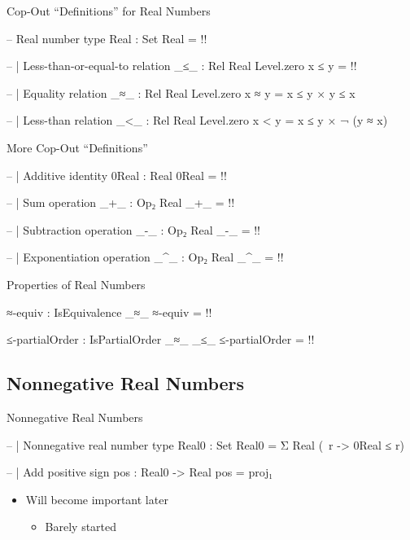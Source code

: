 \documentclass{beamer}
\begin{document}
\begin{frame}{Cop-Out ``Definitions'' for Real Numbers}
\begin{code}
-- Real number type
Real : Set
Real = {!!}

-- | Less-than-or-equal-to relation
_≤_ : Rel Real Level.zero
x ≤ y = {!!}

-- | Equality relation
_≈_ : Rel Real Level.zero
x ≈ y = x ≤ y × y ≤ x

-- | Less-than relation
_<_ : Rel Real Level.zero
x < y = x ≤ y × ¬ (y ≈ x)
\end{code}
\end{frame}

\begin{frame}{More Cop-Out ``Definitions''}
\begin{code}
-- | Additive identity
0Real : Real
0Real = {!!}

-- | Sum operation
_+_ : Op₂ Real
_+_ = {!!}

-- | Subtraction operation
_-_ : Op₂ Real
_-_ = {!!}

-- | Exponentiation operation
_^_ : Op₂ Real
_^_ = {!!}
\end{code}
\end{frame}

\begin{frame}{Properties of Real Numbers}
\begin{code}
≈-equiv : IsEquivalence _≈_
≈-equiv = {!!}

≤-partialOrder : IsPartialOrder _≈_ _≤_
≤-partialOrder = {!!}
\end{code}
\end{frame}

\subsection{Nonnegative Real Numbers}

\begin{frame}{Nonnegative Real Numbers}
\begin{code}
-- | Nonnegative real number type
Real0 : Set
Real0 = Σ Real (\ r -> 0Real ≤ r)

-- | Add positive sign
pos : Real0 -> Real
pos = proj₁
\end{code}

\begin{itemize}
  \item Will become important later
  \begin{itemize}
    \item Barely started
  \end{itemize}
\end{itemize}
\end{frame}
\end{document}
